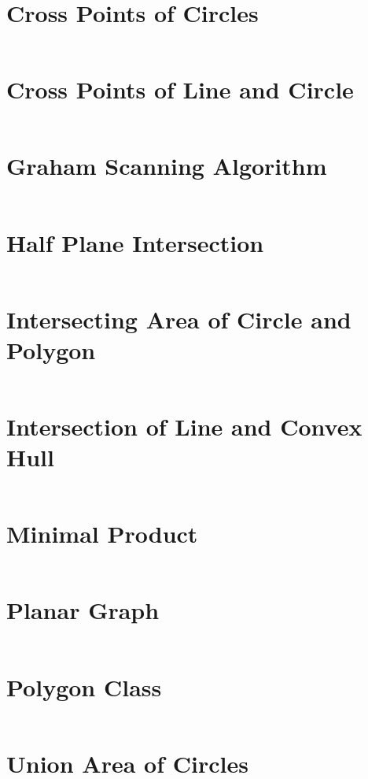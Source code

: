 \documentclass[a4paper,openany]{book}
\newcommand{\cppcode}[1]
{
  \inputminted[mathescape,
  tabsize=4,
  linenos,
  framesep=2mm,
  breakaftergroup=true,
  breakautoindent=true,
  breakbytoken=true,
  breaklines=true,
  fontsize=\small
  ]{cpp}{Source/#1}
}
\begin{document}
\section{Cross Points of Circles}
\cppcode{Computational Geometry/Cross Points of Circles.cpp}
\section{Cross Points of Line and Circle}
\cppcode{Computational Geometry/Cross Points of Line and Circle.cpp}
\section{Graham Scanning Algorithm}
\cppcode{Computational Geometry/Graham Scanning Algorithm.cpp}
\section{Half Plane Intersection}
\cppcode{Computational Geometry/Half Plane Intersection.cpp}
\section{Intersecting Area of Circle and Polygon}
\cppcode{Computational Geometry/Intersecting Area of Circle and Polygon.cpp}
\section{Intersection of Line and Convex Hull}
\cppcode{Computational Geometry/Intersection of Line and Convex Hull.cpp}
\section{Minimal Product}
\cppcode{Computational Geometry/Minimal Product.cpp}
\section{Planar Graph}
\cppcode{Computational Geometry/Planar Graph.cpp}
\section{Polygon Class}
\cppcode{Computational Geometry/Polygon Class.cpp}
\section{Union Area of Circles}
\cppcode{Computational Geometry/Union Area of Circles.cpp}
\end{document}
